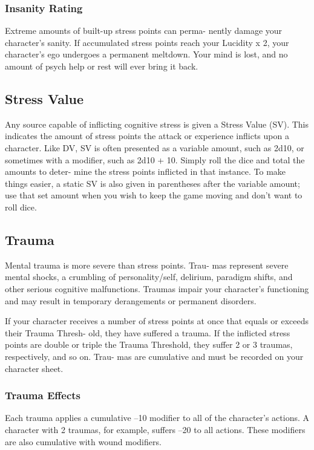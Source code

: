 \subsubsection{Insanity Rating}

Extreme amounts of built-up stress points can perma-
nently damage your character's sanity. If accumulated 
stress points reach your Lucidity x 2, your character's 
ego undergoes a permanent meltdown. Your mind is 
lost, and no amount of psych help or rest will ever 
bring it back.

\subsection{Stress Value}

Any source capable of inflicting cognitive stress is given 
a Stress Value (SV). This indicates the amount of stress 
points the attack or experience inflicts upon a character. 
Like DV, SV is often presented as a variable amount, such 
as 2d10, or sometimes with a modifier, such as 2d10 + 
10. Simply roll the dice and total the amounts to deter-
mine the stress points inflicted in that instance. To make 
things easier, a static SV is also given in parentheses after 
the variable amount; use that set amount when you wish 
to keep the game moving and don't want to roll dice.

\subsection{Trauma}

Mental trauma is more severe than stress points. Trau-
mas represent severe mental shocks, a crumbling of 
personality/self, delirium, paradigm shifts, and other 
serious cognitive malfunctions. Traumas impair your 
character's functioning and may result in temporary 
derangements or permanent disorders.

If your character receives a number of stress points 
at once that equals or exceeds their Trauma Thresh-
old, they have suffered a trauma. If the inflicted stress 
points are double or triple the Trauma Threshold, they 
suffer 2 or 3 traumas, respectively, and so on. Trau-
mas are cumulative and must be recorded on your 
character sheet.

\subsubsection{Trauma Effects}

Each trauma applies a cumulative –10 modifier to all 
of the character's actions. A character with 2 traumas, 
for example, suffers –20 to all actions. These modifiers 
are also cumulative with wound modifiers.

